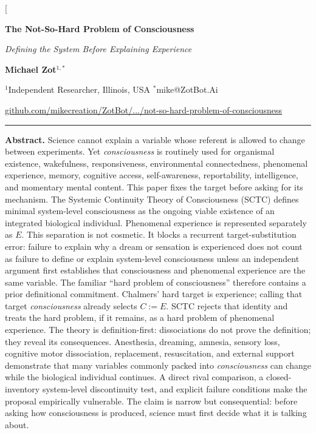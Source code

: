 \documentclass[9pt,twocolumn]{article}
\newcommand{\repoURL}{https://github.com/mikecreation/ZotBot/tree/main/research/not-so-hard-problem-of-consciousness}
\begin{document}
\twocolumn[
\begin{@twocolumnfalse}
\begin{center}
{\LARGE\bfseries The Not-So-Hard Problem of Consciousness\par}
\vspace{0.25em}
{\large\itshape Defining the System Before Explaining Experience\par}
\vspace{0.65em}
{\normalsize\bfseries Michael Zot$^{1,*}$\par}
\vspace{0.15em}
{\small $^1$Independent Researcher, Illinois, USA \quad $^*$mike@ZotBot.Ai\par}
\vspace{0.12em}
{\small\href{\repoURL}{github.com/mikecreation/ZotBot/.../not-so-hard-problem-of-consciousness}\par}
\end{center}
\vspace{0.45em}
\hrule
\vspace{0.55em}
\noindent\textbf{Abstract.}
Science cannot explain a variable whose referent is allowed to change between experiments. Yet \emph{consciousness} is routinely used for organismal existence, wakefulness, responsiveness, environmental connectedness, phenomenal experience, memory, cognitive access, self-awareness, reportability, intelligence, and momentary mental content. This paper fixes the target before asking for its mechanism. The Systemic Continuity Theory of Consciousness (SCTC) defines minimal system-level consciousness as the ongoing viable existence of an integrated biological individual. Phenomenal experience is represented separately as $E$. This separation is not cosmetic. It blocks a recurrent target-substitution error: failure to explain why a dream or sensation is experienced does not count as failure to define or explain system-level consciousness unless an independent argument first establishes that consciousness and phenomenal experience are the same variable. The familiar ``hard problem of consciousness'' therefore contains a prior definitional commitment. Chalmers' hard target is experience; calling that target \emph{consciousness} already selects $C:=E$. SCTC rejects that identity and treats the hard problem, if it remains, as a hard problem of phenomenal experience. The theory is definition-first: dissociations do not prove the definition; they reveal its consequences. Anesthesia, dreaming, amnesia, sensory loss, cognitive motor dissociation, replacement, resuscitation, and external support demonstrate that many variables commonly packed into \emph{consciousness} can change while the biological individual continues. A direct rival comparison, a closed-inventory system-level discontinuity test, and explicit failure conditions make the proposal empirically vulnerable. The claim is narrow but consequential: before asking how consciousness is produced, science must first decide what it is talking about.


\end{@twocolumnfalse}
\end{document}
